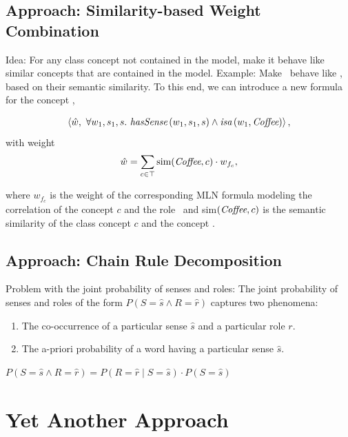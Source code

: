 \documentclass[12pt,a4paper]{article}
\begin{document}
\subsection{Approach: Similarity-based Weight Combination}

Idea: For any class concept not contained in the model, make it 
behave like similar concepts that are contained in the model. 
Example: Make \Coffee\ behave like \FruitJuice, based on their 
semantic similarity. To this end, we can introduce a new formula for 
the concept \Coffee,

\begin{eqnarray}
	\left<\hat{w},\ \forall w_1,s_1,s.\ \hasSense(w_1,s_1,s)\wedge\isa(w_1,\Coffee) \right> ,\nonumber
\end{eqnarray}
with weight
\begin{eqnarray}
	\hat{w}=\sum_{c\in\top}\text{sim}(\textit{Coffee},c)\cdot w_{f_{c}},\nonumber
\end{eqnarray}

where $w_{f_{c}}$ is the weight of the corresponding MLN formula 
modeling the correlation of the concept $c$ and the role \Theme\ and 
sim$(\textit{Coffee},c)$ is the semantic similarity of the class concept $c$ 
and the concept \Coffee.

\subsection{Approach: Chain Rule Decomposition}

Problem with the joint probability of senses and roles: The joint 
probability of senses and roles of the form $P(S=\widehat{s}\wedge 
R=\widehat{r})$ captures two phenomena:

\begin{enumerate}

	\item The co-occurrence of a particular sense $\widehat{s}$ and 
	a particular role $r$.

	\item The a-priori probability of a word having a particular 
	sense $\widehat{s}$.

\end{enumerate}

$P(S=\widehat{s}\wedge R=\widehat{r})=P(R=\widehat{r}\mid S=\widehat{s})\cdot P(S=\widehat{s})$
 
\section{Yet Another Approach}
\end{document}
